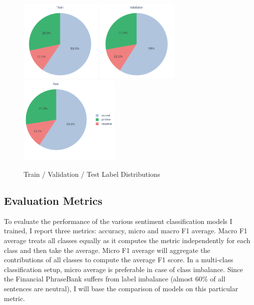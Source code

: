 \documentclass[final]{cvpr}
\begin{document}
\begin{figure}[h!]
	\centering
	\includegraphics[width=4.0cm]{fig/label_distribution_train.pdf}
	\includegraphics[width=4.0cm]{fig/label_distribution_val.pdf}
	\includegraphics[width=4.9cm]{fig/label_distribution_test.pdf}
	\caption{Train / Validation / Test Label Distributions}
	\label{fig:sub_abel_distribution}
\end{figure}

\subsection{Evaluation Metrics}

To evaluate the performance of the various sentiment classification models I trained, I report three metrics: accuracy, micro and macro F1 average. Macro F1 average treats all classes equally as it computes the metric independently for each class and then take the average. Micro F1 average will aggregate the contributions of all classes to compute the average F1 score. In a multi-class classification setup, micro average is preferable in case of class imbalance. Since the Financial PhraseBank suffers from label imbalance (almost $60$\% of all sentences are neutral), I will base the comparison of models on this particular metric.
\end{document}

